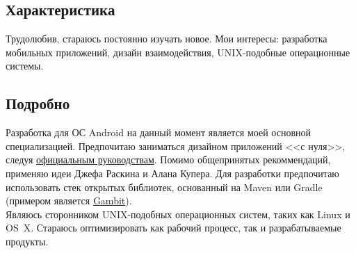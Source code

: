     \subsection*{Характеристика}

      Трудолюбив, стараюсь постоянно изучать новое.
      Мои интересы: разработка мобильных приложений, дизайн
      взаимодействия, UNIX-подобные операционные системы.

    \subsection*{Подробно}

      Разработка для ОС Android на данный момент является моей основной специализацией.
      Предпочитаю заниматься дизайном приложений <<с нуля>>, следуя
      \href{https://developer.android.com/design/}{официальным руководствам}.
      Помимо общепринятых рекоммендаций, применяю идеи Джефа Раскина
      и Алана Купера. Для разработки предпочитаю использовать стек
      открытых библиотек, основанный на Maven или Gradle (примером является
      \href{https://github.com/ming13/gambit}{Gambit}). \\

      Являюсь сторонником UNIX-подобных операционных систем,
      таких как Linux и OS~X. Стараюсь оптимизировать как рабочий процесс,
      так и разрабатываемые продукты. \\

  \vfill


